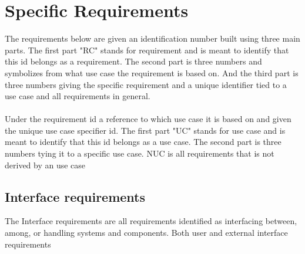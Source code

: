 \section{Specific Requirements}
The requirements below are given an identification number built using three main parts. The first part "RC" stands for requirement and is meant to identify that this id belongs as a requirement. The second part is three numbers and symbolizes from what use case the requirement is based on. And the third part is three numbers giving the specific requirement and a unique identifier tied to a use case and all requirements in general.
\\\\
Under the requirement id a reference to which use case it is based on and given the unique use case specifier id. The first part "UC" stands for use case and is meant to identify that this id belongs as a use case. The second part is three numbers tying it to a specific use case. NUC is all requirements that is not derived by an use case
\label{sec:specificrequirements}

\subsection{Interface requirements}
The Interface requirements are all requirements identified as interfacing between, among, or handling systems and components. Both user and external interface requirements
